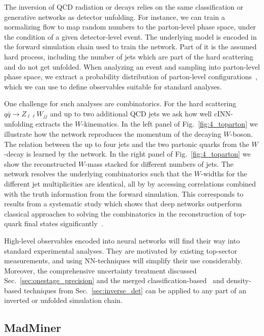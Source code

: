 \documentclass[submission,Phys]{SciPost}
\begin{document}
The inversion of QCD radiation or decays relies on the same classification or generative networks as detector unfolding. For instance, we can train a normalizing flow to map random numbers to the parton-level phase space, under the condition of a given detector-level event. The underlying model is encoded in the forward simulation chain used to train the network. Part of it is the assumed hard process, including the number of jets which are part of the hard scattering and do not get unfolded. When analyzing an event and sampling into parton-level phase space, we extract a probability distribution of parton-level configurations~\cite{Bellagente:2020piv}, which we can use to define observables suitable for standard analyses.

One challenge for such analyses are combinatorics. For the hard scattering $q\bar{q} \to Z_{\ell \ell} W_{jj}$ and up to two additional QCD jets we ask how well cINN-unfolding extracts the $W$-kinematics. In the left panel of Fig.~\ref{fig:4_toparton} we illustrate how the network reproduces the momentum of the decaying $W$-boson. The relation between the up to four jets and the two partonic quarks from the $W$-decay is learned by the network. In the right panel of Fig.~\ref{fig:4_toparton} we show the reconstructed $W$-mass stacked for different numbers of jets. The network resolves the underlying combinatorics such that the $W$-widths for the different jet multiplicities are identical, all by by accessing correlations combined with the truth information from the forward simulation. This corresponds to results from a systematic study which shows that deep networks outperform classical approaches to solving the combinatorics in the reconstruction of top-quark final states significantly~\cite{Erdmann:2019evj}.

High-level observables encoded into neural networks will find their way into standard experimental analyses. They are motivated by existing top-sector measurements, and using NN-techniques will simplify their use considerably. Moreover, the comprehensive uncertainty treatment discussed Sec.~\ref{sec:onestage_precision} and the merged classification-based~\cite{Andreassen:2019cjw} and density-based techniques from Sec.~\ref{sec:inverse_det} can be applied to any part of an inverted or unfolded simulation chain. 

\subsection{MadMiner}
\label{sec:inference_mad}
\end{document}
